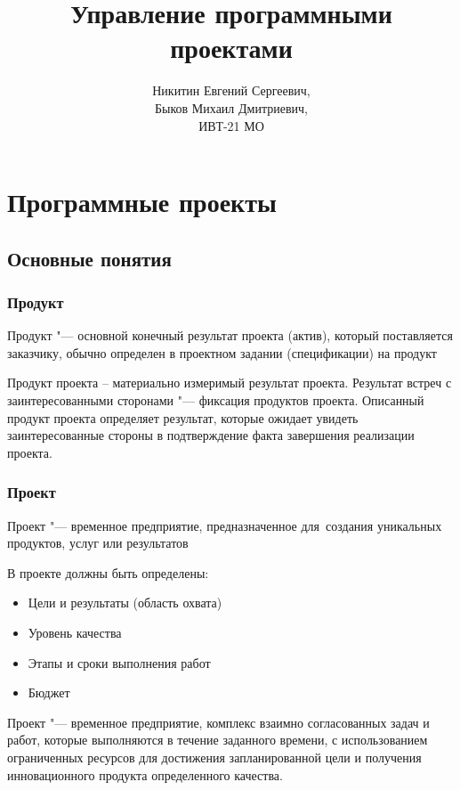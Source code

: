 \documentclass{../industrial-development}
\title{Управление программными проектами}
\author{Никитин Евгений Сергеевич,\\Быков Михаил Дмитриевич,\\ИВТ-21 МО}
\date{}
\begin{document}
    
    \begin{frame}
      \titlepage
    \end{frame}

    \section{Программные проекты}

    \subsection{Основные понятия}

    \begin{frame} \frametitle{Продукт}
        \begin{definition}
            \alert{Продукт} "--- основной \alert{конечный результат} проекта (актив), который поставляется заказчику, обычно определен в проектном задании (спецификации) на продукт
        \end{definition}
        \medskip
    \end{frame}
    \lecturenotes

Продукт проекта – материально измеримый результат проекта. Результат встреч с заинтересованными сторонами "--- фиксация продуктов проекта. Описанный продукт проекта определяет результат, которые ожидает увидеть заинтересованные стороны в подтверждение факта завершения реализации проекта.

    \begin{frame} \frametitle{Проект}
        \begin{definition}
            \alert{Проект} "--- временное предприятие, предназначенное для~создания уникальных продуктов, услуг или результатов
        \end{definition}
        \medskip
        В проекте должны быть определены:
        \begin{itemize}
            \item Цели и результаты (область охвата)
            \item Уровень качества
            \item Этапы и сроки выполнения работ
            \item Бюджет
        \end{itemize}
    \end{frame}
    \lecturenotes

Проект "--- временное предприятие,  комплекс взаимно согласованных задач и работ, которые выполняются в течение заданного времени, с использованием ограниченных ресурсов для достижения запланированной цели и получения инновационного продукта определенного качества.
\end{document}
